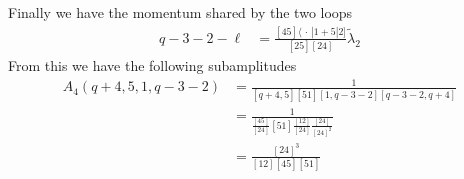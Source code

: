 \documentclass[a4paper,12pt]{article}
\newcommand{\aMs}[3]{\langle #1|#2|#3]}  		%
\begin{document}
Finally we have the momentum shared by the two loops
\begin{equation}
	\begin{aligned}
	q-3-2-\ell&=\frac{\left[45\right]\aMs{\,\cdot\,}{1+5}{2}}{\left[25\right]\left[24\right]}\tilde\lambda_2	
	\end{aligned}
\end{equation}
From this we have the following subamplitudes
\begin{equation}
	\begin{aligned}
		A_4(q+4,5,1,q-3-2)&=\frac{1}{\left[q+4,5\right]\left[51\right]\left[1,q-3-2\right]\left[q-3-2,q+4\right]}\\
		&=\frac{1}{\frac{\left[45\right]}{\left[24\right]}\left[51\right]\frac{\left[12\right]}{\left[24\right]}\frac{\left[24\right]}{\left[24\right]^2}}\\
		&=\frac{[24]^3}{[12]\left[45\right][51]}
	\end{aligned}
\end{equation}
\end{document}
